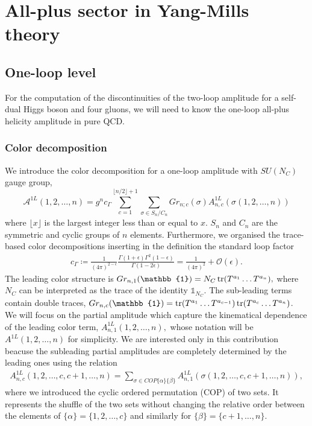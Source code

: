 \chapter{All-plus sector in Yang-Mills theory} \label{secYM}
\section{One-loop level}
For the computation of the discontinuities of the two-loop amplitude for a self-dual Higgs boson and four gluons, we will need to know the one-loop all-plus helicity amplitude in pure QCD. 
\subsection{Color decomposition}
We introduce the color decomposition for a one-loop amplitude with $SU(N_C)$ gauge group,
$$
	\mathcal{A}^{1L}(1,2,\dots,n)=g^n c_\Gamma \sum_{c=1}^{\lfloor n/2 \rfloor+1} \sum_{\sigma\in S_n/C_n} Gr_{n;c}(\sigma) A^{1L}_{n,c}\left(\sigma(1,2,\dots,n)\right)
$$
where $\lfloor x \rfloor$ is the largest integer less than or equal to $x$. $S_n$ and $C_n$ are the symmetric and cyclic groups of $n$ elements. Furthermore, we organised the trace-based color decompositions inserting in the definition the standard loop factor
\begin{align}
	c_\Gamma\coloneqq \frac{1}{(4\pi)^{2-\epsilon}} \frac{\Gamma(1+\epsilon)\Gamma^2(1-\epsilon)}{\Gamma(1-2\epsilon)}=\frac{1}{(4\pi)^2}+\mathcal{O}(\epsilon).	\label{defcg}
\end{align}
The leading color structure is
$
	Gr_{n,1}(\mathbb{1})=N_C \tr(T^{a_1}\dots T^{a_n}),
$
where $N_C$ can be interpreted as the trace of the identity $\mathbb{1}_{N_C}$. The sub-leading terms contain double traces,
$
	Gr_{n,c}(\mathbb{1})=\tr(T^{a_1}\dots T^{a_{c-1}})\tr(T^{a_c}\dots T^{a_n})
$.\\

We will focus on the partial amplitude which capture the kinematical dependence of the leading color term,
$
	A_{n,1}^{1L}(1,2,\dots,n),
$
whose notation will be $A^{1L}(1,2,\dots,n)$ for simplicity. We are interested only in this contribution beacuse the subleading partial amplitudes are completely determined by the leading ones using the relation \cite{Bern:1990ux}
\begin{align*}
	A^{1L}_{n,c}(1,2,\dots, c ,c+1,\dots, n)=\sum_{\sigma\in COP\{\alpha\}\{\beta\}}A^{1L}_{n,1}(\sigma(1,2,\dots, c ,c+1,\dots, n)),
\end{align*}
where we introduced the cyclic ordered permutation (COP) of two sets. It represents the shuffle of the two sets without changing the relative order between the elements of $\{\alpha\}=\{1,2,\dots,c\}$ and similarly for $\{\beta\}=\{c+1,\dots,n\}$.\\

